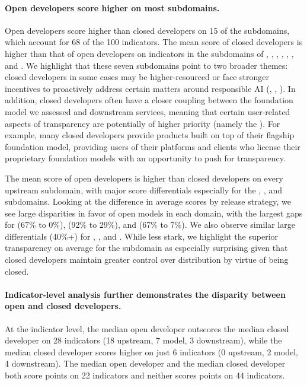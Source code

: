 \paragraph{Open developers score higher on most subdomains.}
Open developers score higher than closed developers on 15 of the \numsubdomains subdomains, which account for 68 of the 100 indicators. 
The mean score of closed developers is higher than that of open developers on indicators in the subdomains of \capabilities, \risks, \modelmitigations, \trustworthiness, \usagepolicy, \modelbehaviorpolicy, and \documentation.
We highlight that these seven subdomains point to two broader themes: closed developers in some cases may be higher-resourced or face stronger incentives to proactively address certain matters around responsible AI (\eg \risks, \modelmitigations, \trustworthiness).
In addition, closed developers often have a closer coupling between the foundation model we assessed and downstream services, meaning that certain user-related aspects of transparency are potentially of higher priority (namely the \usagepolicy). 
For example, many closed developers provide products built on top of their flagship foundation model, providing users of their platforms and clients who license their proprietary foundation models with an opportunity to push for transparency.

The mean score of open developers is higher than closed developers on every upstream subdomain, with major score differentials especially for the \data, \compute, and \methods subdomains.
Looking at the difference in average scores by release strategy, we see large disparities in favor of open models in each domain, with the largest gaps for \dataaccess (67\% to 0\%), \methods (92\% to 29\%), and \datamitigations(67\% to 7\%).
We also observe similar large differentials (40\%+) for \modelbasics, \modelaccess, and \updates.
While less stark, we highlight the superior transparency on average for the \distribution subdomain as especially surprising given that closed developers maintain greater control over distribution by virtue of being closed.

\paragraph{Indicator-level analysis further demonstrates the disparity between open and closed developers.}
At the indicator level, the median open developer outscores the median closed developer on 28 indicators (18 upstream, 7 model, 3 downstream), while the median closed developer scores higher on just 6 indicators (0 upstream, 2 model, 4 downstream). 
The median open developer and the median closed developer both score points on 22 indicators and neither scores points on 44 indicators. 


